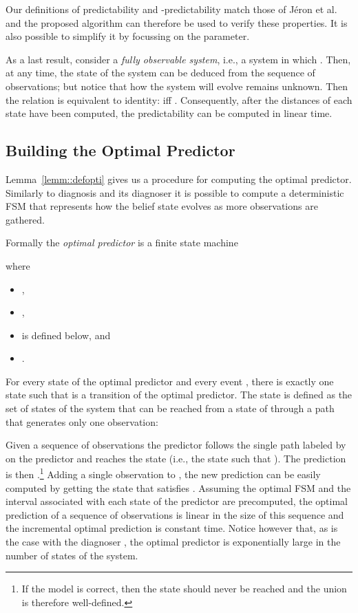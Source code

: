 \documentclass{article}
\begin{document}
Our definitions of predictability and -predictability 
match those of J\'eron et al. \cite{jeron-etal::wc::08} 
and the proposed algorithm can therefore be used 
to verify these properties.  
It is also possible to simplify it 
by focussing on the  parameter.  

As a last result, consider a \emph{fully observable system}, 
i.e., a system in which .  
Then, at any time, the state of the system can be deduced 
from the sequence of observations; 
but notice that how the system will evolve 
remains unknown.  
Then the relation  is equivalent to identity: 
 iff .  
Consequently, after the distances of each state have been computed, 
the predictability can be computed in linear time.  

\subsection{Building the Optimal Predictor}

Lemma~\ref{lemm::defopti} gives us a procedure 
for computing the optimal predictor.  
Similarly to diagnosis and its diagnoser \cite{sampath-etal::tac::95} 
it is possible to compute a deterministic FSM 
that represents how the belief state evolves 
as more observations are gathered.  

Formally the \emph{optimal predictor} is a finite state machine 
 
where 
\begin{itemize}
\item 
  , 
\item 
  , 
\item 
   
  is defined below, 
  and 
\item 
  . 
\end{itemize}

For every state  of the optimal predictor
and every event , 
there is exactly one state  
such that  
is a transition of the optimal predictor.  
The state  is defined 
as the set of states of the system 
that can be reached from a state of  
through a path that generates only one observation: 


Given a sequence  of observations 
the predictor follows the single path labeled by  
on the predictor and reaches the state  
(i.e., the state  
such that ).  
The prediction is then .\footnote{If the model is correct, 
then the state  should never be reached 
and the union is therefore well-defined.}
Adding a single observation  to , 
the new prediction can be easily computed 
by getting the state  that satisfies 
.  
Assuming the optimal FSM 
and the interval associated with each state of the predictor 
are precomputed, 
the optimal prediction of a sequence of observations 
is linear in the size of this sequence 
and the incremental optimal prediction is constant time.  
Notice however that, as is the case with the diagnoser 
\cite{rintanen::ijcai::07}, 
the optimal predictor is exponentially large 
in the number of states of the system.  
\end{document}
